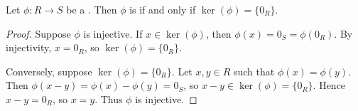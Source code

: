 \begin{proposition} \label{proposition:ring_homomorphism_is_injective_iff_kernel_is_trivial}
Let $\phi: R \to S$ be a . Then $\phi$ is  if and only if $\operatorname{ker}(\phi) = \{0_R\}$.
\end{proposition}

\begin{proof}
Suppose $\phi$ is injective. If $x \in \operatorname{ker}(\phi)$, then $\phi(x) = 0_S = \phi(0_R)$. By injectivity, $x = 0_R$, so $\operatorname{ker}(\phi) = \{0_R\}$.

Conversely, suppose $\operatorname{ker}(\phi) = \{0_R\}$. Let $x, y \in R$ such that $\phi(x) = \phi(y)$. Then $\phi(x - y) = \phi(x) - \phi(y) = 0_S$, so $x - y \in \operatorname{ker}(\phi) = \{0_R\}$. Hence $x - y = 0_R$, so $x = y$. Thus $\phi$ is injective.
\end{proof}